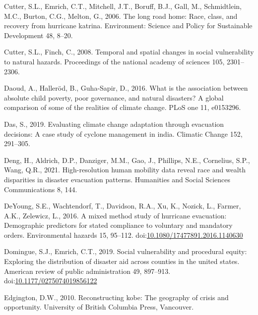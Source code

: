 \documentclass[]{elsarticle} %
\newlength{\cslhangindent}
\newlength{\cslentryspacingunit} %
\newenvironment{CSLReferences}[2] %
 {%
  \setlength{\parindent}{0pt}
  \ifodd #1
  \let\oldpar\par
  \def\par{\hangindent=\cslhangindent\oldpar}
  \fi
  \setlength{\parskip}{#2\cslentryspacingunit}
 }%
 {}
\begin{document}
\begin{CSLReferences}{1}{0}
\leavevmode{}%
Cutter, S.L., Emrich, C.T., Mitchell, J.T., Boruff, B.J., Gall, M.,
Schmidtlein, M.C., Burton, C.G., Melton, G., 2006. The long road home:
Race, class, and recovery from hurricane katrina. Environment: Science
and Policy for Sustainable Development 48, 8--20.

\leavevmode{}%
Cutter, S.L., Finch, C., 2008. Temporal and spatial changes in social
vulnerability to natural hazards. Proceedings of the national academy of
sciences 105, 2301--2306.

\leavevmode{}%
Daoud, A., Halleröd, B., Guha-Sapir, D., 2016. What is the association
between absolute child poverty, poor governance, and natural disasters?
A global comparison of some of the realities of climate change. PLoS one
11, e0153296.

\leavevmode{}%
Das, S., 2019. Evaluating climate change adaptation through evacuation
decisions: A case study of cyclone management in india. Climatic Change
152, 291--305.

\leavevmode{}%
Deng, H., Aldrich, D.P., Danziger, M.M., Gao, J., Phillips, N.E.,
Cornelius, S.P., Wang, Q.R., 2021. High-resolution human mobility data
reveal race and wealth disparities in disaster evacuation patterns.
Humanities and Social Sciences Communications 8, 144.

\leavevmode{}%
DeYoung, S.E., Wachtendorf, T., Davidson, R.A., Xu, K., Nozick, L.,
Farmer, A.K., Zelewicz, L., 2016. A mixed method study of hurricane
evacuation: Demographic predictors for stated compliance to voluntary
and mandatory orders. Environmental hazards 15, 95--112.
doi:\href{https://doi.org/10.1080/17477891.2016.1140630}{10.1080/17477891.2016.1140630}

\leavevmode{}%
Domingue, S.J., Emrich, C.T., 2019. Social vulnerability and procedural
equity: Exploring the distribution of disaster aid across counties in
the united states. American review of public administration 49,
897--913.
doi:\href{https://doi.org/10.1177/0275074019856122}{10.1177/0275074019856122}

\leavevmode{}%
Edgington, D.W., 2010. Reconstructing kobe: The geography of crisis and
opportunity. University of British Columbia Press, Vancouver.


\end{CSLReferences}
\end{document}
